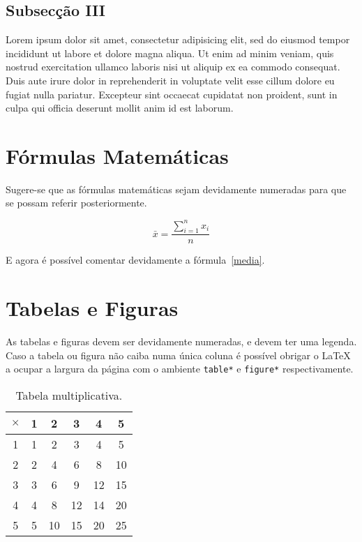 \documentclass[a4paper, twocolumn, 11pt, twoside]{article}
\begin{document}
\subsection{Subsecção III}

Lorem ipsum dolor sit amet, consectetur adipisicing elit, sed do eiusmod
tempor incididunt ut labore et dolore magna aliqua. Ut enim ad minim
veniam, quis nostrud exercitation ullamco laboris nisi ut aliquip ex ea
commodo consequat. Duis aute irure dolor in reprehenderit in voluptate
velit esse cillum dolore eu fugiat nulla pariatur. Excepteur sint
occaecat cupidatat non proident, sunt in culpa qui officia deserunt
mollit anim id est laborum.

\section{Fórmulas Matemáticas}

Sugere-se que as fórmulas matemáticas sejam devidamente numeradas para
que se possam referir posteriormente.

\begin{equation}
  \label{media}
  \bar{x} = \frac{\sum_{i=1}^n x_i}{n}
\end{equation}

E agora é possível comentar devidamente a fórmula~\ref{media}.

\section{Tabelas e Figuras}

As tabelas e figuras devem ser devidamente numeradas, e devem ter uma legenda.
Caso a tabela ou figura não caiba numa única coluna é possível obrigar o \LaTeX{} 
a ocupar a largura da página com o ambiente \verb!table*! e \verb!figure*! respectivamente.

\begin{table}
  \centering
  \begin{tabular}{|c|ccccc|}
    \hline
    $\times$ & 1 & 2 & 3 & 4 & 5 \\
    \hline
     1 & 1 & 2 & 3 & 4 & 5 \\
     2 & 2 & 4 & 6 & 8 & 10 \\
     3 & 3 & 6 & 9 & 12 & 15 \\
     4 & 4 & 8 & 12 & 14 & 20 \\
     5 & 5 & 10 & 15 & 20 & 25 \\
     \hline
  \end{tabular}
  \caption{Tabela multiplicativa.}
\end{table}
\end{document}
